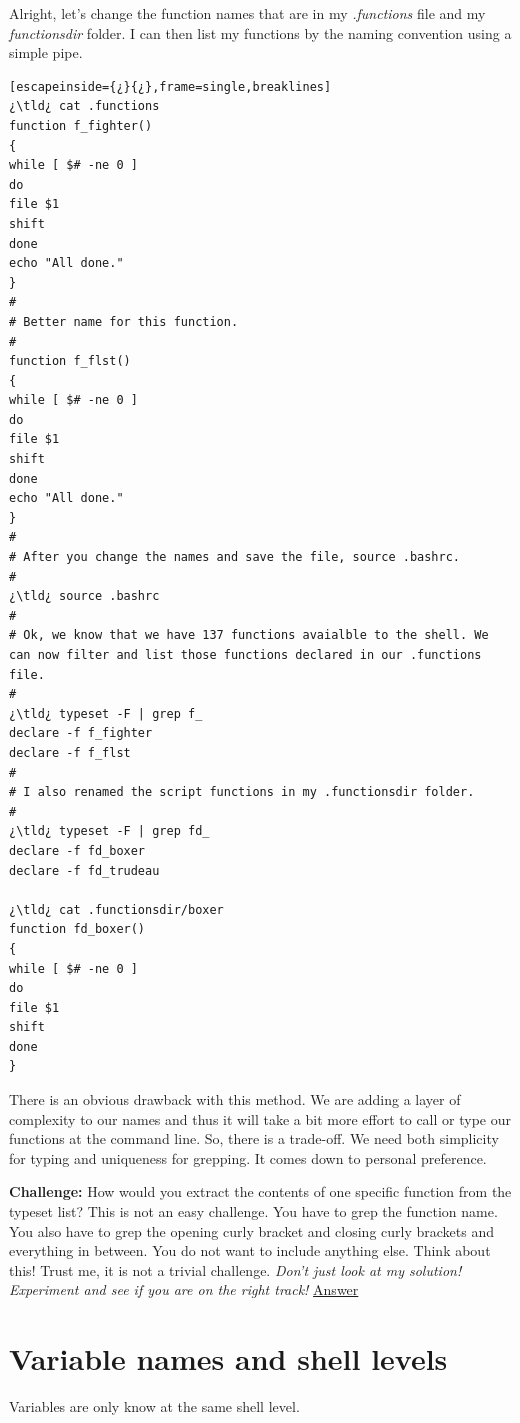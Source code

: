 Alright, let's change the function names that are in my \textsl{\ttb{}.functions} file and my \textsl{\ttb{}functionsdir} folder. I can then list my functions by the naming convention using a simple  pipe.

\begin{lstlisting}[escapeinside={¿}{¿},frame=single,breaklines]
¿\tld¿ cat .functions
function f_fighter() 
{
while [ $# -ne 0 ]
do
file $1
shift
done
echo "All done."
}
#
# Better name for this function.
#
function f_flst() 
{
while [ $# -ne 0 ]
do
file $1
shift
done
echo "All done."
}
#
# After you change the names and save the file, source .bashrc.
#
¿\tld¿ source .bashrc
#
# Ok, we know that we have 137 functions avaialble to the shell. We can now filter and list those functions declared in our .functions file.
#
¿\tld¿ typeset -F | grep f_
declare -f f_fighter
declare -f f_flst
#
# I also renamed the script functions in my .functionsdir folder.
#
¿\tld¿ typeset -F | grep fd_
declare -f fd_boxer
declare -f fd_trudeau

¿\tld¿ cat .functionsdir/boxer
function fd_boxer()
{
while [ $# -ne 0 ]
do
file $1
shift
done
}
\end{lstlisting}

There is an obvious drawback with this method. We are adding a layer of complexity to our names and thus it will take a bit more effort to call or type our functions at the command line. So, there is a trade-off. We need both simplicity for typing and uniqueness for grepping. It comes down to personal preference.

\textbf{\color{red}Challenge:} How would you extract the contents of one specific function from  the typeset list? This is not an easy challenge. You have to grep the function name. You also have to grep the opening curly bracket and closing curly brackets and everything in between. You do not want to include anything else. Think about this! Trust me, it is not a trivial challenge. \textit{Don't just look at my solution! Experiment and see if you are on the right track!} \hyperlink{prgrm_typeset}{Answer}

\section{Variable names and shell levels}

Variables are only know at the same shell level.

